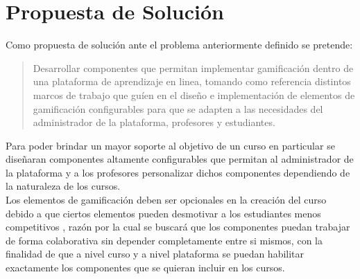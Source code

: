 
 \clearpage

\section{Propuesta de Solución} \label{sec:propuesta}

 \noindent Como propuesta de solución ante el problema anteriormente definido se
 pretende:

    \begin{quote}
    \colorbox{blue!05}{\parbox{\dimexpr\linewidth-2\fboxsep}{\strut%
        Desarrollar componentes que permitan implementar gamificación dentro
        de una plataforma de aprendizaje en linea, tomando como referencia
        distintos marcos de trabajo que guíen en el diseño e implementación
        de elementos de gamificación configurables para que se adapten a las
        necesidades del administrador de la plataforma, profesores y estudiantes.
    \strut}}%
    \end{quote}

 \noindent Para poder brindar un mayor soporte al objetivo de un curso en particular
 se diseñaran componentes altamente configurables que permitan al administrador de la
 plataforma y a los profesores personalizar dichos componentes dependiendo de la
 naturaleza de los cursos.\\

 \noindent Los elementos de gamificación deben ser opcionales en la creación del
 curso debido a que ciertos elementos pueden desmotivar a los estudiantes menos
 competitivos \cite{GamInE-Learning}, razón por la cual se buscará que los componentes
 puedan trabajar de forma colaborativa sin depender completamente entre si mismos,
 con la finalidad de que a nivel curso y a nivel plataforma se puedan habilitar
 exactamente los componentes que se quieran incluir en los cursos.\\

